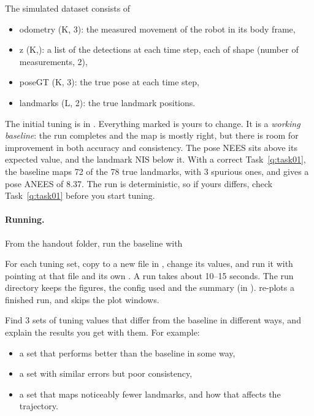 \label{q:task02}
The simulated dataset consists of
\begin{itemize}
    \item odometry (K, 3): the measured movement of the robot in its body frame,
    \item z (K,): a list of the detections at each time step, each of shape (number of measurements, 2),
    \item poseGT (K, 3): the true pose at each time step,
    \item landmarks (L, 2): the true landmark positions.
\end{itemize}

The initial tuning is in . Everything marked  is yours to change. It is a \emph{working baseline}: the run completes and the map is mostly right, but there is room for improvement in both accuracy and consistency. The pose NEES sits above its expected value, and the landmark NIS below it. With a correct Task~\ref{q:task01}, the baseline maps 72 of the 78 true landmarks, with 3 spurious ones, and gives a pose ANEES of 8.37. The run is deterministic, so if yours differs, check Task~\ref{q:task01} before you start tuning.

\paragraph{Running.} From the handout folder, run the baseline with
\begin{center}
\end{center}
For each tuning set, copy  to a new file in , change its values, and run it with  pointing at that file and its own . A run takes about 10--15 seconds. The run directory keeps the figures, the config used and the summary (in ).  re-plots a finished run, and  skips the plot windows.

Find 3 sets of tuning values that differ from the baseline in different ways, and explain the results you get with them. For example:
\begin{itemize}
    \item a set that performs better than the baseline in some way,
    \item a set with similar errors but poor consistency,
    \item a set that maps noticeably fewer landmarks, and how that affects the trajectory.
\end{itemize}

